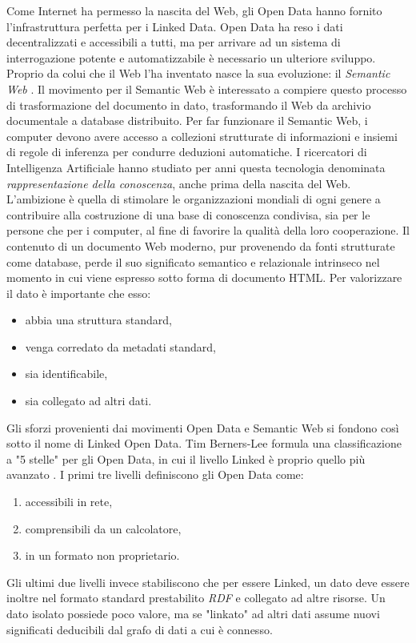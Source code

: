 Come Internet ha permesso la nascita del Web, gli Open Data hanno fornito l'infrastruttura perfetta per i Linked Data. Open Data ha reso i dati decentralizzati e accessibili a tutti, ma per arrivare ad un sistema di interrogazione potente e automatizzabile è necessario un ulteriore sviluppo. Proprio da colui che il Web l'ha inventato nasce la sua evoluzione: il \textit{Semantic Web} \cite{10.2307/26059207}\cite{semantic_web}\cite{Bizer2009LinkedD}\cite{BernersLee2006TabulatorEA}\cite{semantic_web_w3c}.
Il movimento per il Semantic Web è interessato a compiere questo processo di trasformazione del documento in dato, trasformando il Web da archivio documentale a database distribuito.
Per far funzionare il Semantic Web, i computer devono avere accesso a collezioni strutturate di informazioni e insiemi di regole di inferenza per condurre deduzioni automatiche. I ricercatori di Intelligenza Artificiale hanno studiato per anni questa tecnologia denominata \textit{rappresentazione della conoscenza}, anche prima della nascita del Web. L'ambizione è quella di stimolare le organizzazioni mondiali di ogni genere a contribuire alla costruzione di una base di conoscenza condivisa, sia per le persone che per i computer, al fine di favorire la qualità della loro cooperazione.
Il contenuto di un documento Web moderno, pur provenendo da fonti strutturate come database, perde il suo significato semantico e relazionale intrinseco nel momento in cui viene espresso sotto forma di documento HTML. Per valorizzare il dato è importante che esso:

\begin{itemize}
\item abbia una struttura standard,
\item venga corredato da metadati standard,
\item sia identificabile,
\item sia collegato ad altri dati.
\end{itemize}

Gli sforzi provenienti dai movimenti Open Data e Semantic Web si fondono così sotto il nome di Linked Open Data. Tim Berners-Lee formula una classificazione a "5 stelle" per gli Open Data, in cui il livello Linked è proprio quello più avanzato \cite{5_star_open_data}. I primi tre livelli definiscono gli Open Data come:
\begin{enumerate}
\item accessibili in rete,
\item comprensibili da un calcolatore,
\item in un formato non proprietario.
\end{enumerate}
Gli ultimi due livelli invece stabiliscono che per essere Linked, un dato deve essere inoltre nel formato standard prestabilito \textit{RDF} e collegato ad altre risorse. Un dato isolato possiede poco valore, ma se "linkato" ad altri dati assume nuovi significati deducibili dal grafo di dati a cui è connesso.

